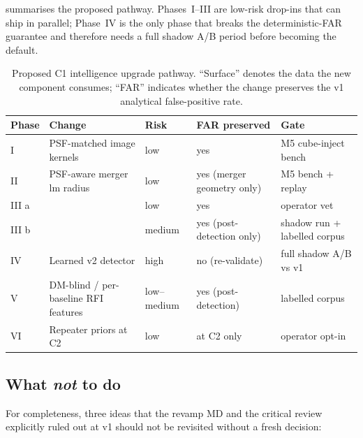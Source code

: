 \documentclass[11pt,a4paper]{article}
\newcommand{\codeword}[1]{\text{\ttfamily\small\detokenize{#1}}}
\begin{document}
 summarises the proposed pathway.  Phases~I--III
are low-risk drop-ins that can ship in parallel; Phase~IV is the only
phase that breaks the deterministic-FAR guarantee and therefore needs
a full shadow A/B period before becoming the default.

\begin{table}[ht]
\centering
\caption{Proposed C1 intelligence upgrade pathway.  ``Surface''
denotes the data the new component consumes; ``FAR'' indicates
whether the change preserves the v1 analytical false-positive
rate.}
\label{tab:c1pathway}
\small
\begin{tabular}{p{2.2cm}p{4cm}p{2.0cm}p{2.6cm}p{2.6cm}}
\toprule
Phase & Change & Risk & FAR preserved & Gate \\
\midrule
I  & PSF-matched image kernels & low & yes & M5 cube-inject bench \\
II & PSF-aware merger lm radius & low & yes (merger geometry only) & M5 bench + replay \\
III a & \codeword{PointingExclusion} & low & yes & operator vet \\
III b & \codeword{LearnedClassifier} & medium & yes (post-detection only) & shadow run + labelled corpus \\
IV  & Learned v2 detector & high & no (re-validate) & full shadow A/B vs v1 \\
V   & DM-blind / per-baseline RFI features & low--medium & yes (post-detection) & labelled corpus \\
VI  & Repeater priors at C2 & low & at C2 only & operator opt-in \\
\bottomrule
\end{tabular}
\end{table}


\subsection{What \emph{not} to do}

For completeness, three ideas that the revamp MD and the critical
review explicitly ruled out at v1 should not be revisited without a
fresh decision:
\end{document}
